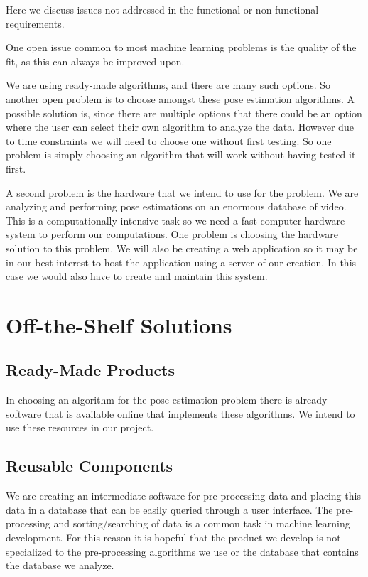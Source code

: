 \documentclass{scrreprt}
\begin{document}
{Here we discuss issues not addressed in the functional or
non-functional requirements.}

One open issue common to most machine learning problems is the quality of the
fit, as this can always be improved upon.

We are using ready-made algorithms, and there are many such options. So
another open problem is to choose amongst these pose estimation algorithms. A
possible solution is, since there are multiple options that there could be an
option where the user can select their own algorithm to analyze the data.
However due to time constraints we will need to choose one without first
testing. So one problem is simply choosing an algorithm that will work without
having tested it first.

A second problem is the hardware that we intend to use for the problem.
We are analyzing and performing pose estimations on an enormous
database of video. This is a computationally intensive task so we need
a fast computer hardware system to perform our computations. One
problem is choosing the hardware solution to this problem. We will also
be creating a web application so it may be in our best interest to host
the application using a server of our creation. In this case we would
also have to create and maintain this system.

\section{Off-the-Shelf Solutions}
\label{off-the-shelf-solutions}

\subsection{Ready-Made Products}

{In choosing an algorithm for the pose estimation problem there is
already software that is available online that implements these
algorithms. We intend to use these resources in our project.}

\subsection{Reusable Components}
\label{reusable-components}

{We are creating an intermediate software for pre-processing data and
placing this data in a database that can be easily queried through a
user interface. The pre-processing and sorting/searching of data is a
common task in machine learning development. For this reason it is
hopeful that the product we develop is not specialized to the
pre-processing algorithms we use or the database that contains the
database we analyze.}
\end{document}
